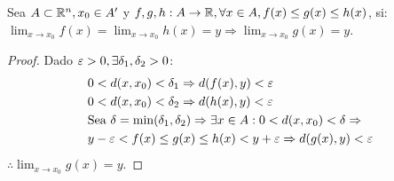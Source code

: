 \begin{theorem}
  Sea \(A \subset \mathbb{R}^n, x_0 \in A^{\prime} \) y \(f, g, h: A \to \mathbb{R}, \forall x \in A, f(x) \leq g(x) \leq h(x)\), si: \\
  \(\lim_{x \to x_0} f(x) = \lim_{x \to x_0} h(x) = y \Rightarrow \lim_{x \to x_0} g(x) = y\).
  \begin{proof}
    Dado \(\varepsilon > 0, \exists \delta_1, \delta_2 > 0\):
    \begin{align*}
       & 0 < d(x, x_0) < \delta_1 \Rightarrow d(f(x), y) < \varepsilon                                                                 \\
       & 0 < d(x, x_0) < \delta_2 \Rightarrow d(h(x), y) < \varepsilon                                                                 \\
       & \text{Sea } \delta = \text{min}(\delta_1, \delta_2) \Rightarrow \exists x \in A : 0 < d(x, x_0) < \delta \Rightarrow \\
       & y - \varepsilon < f(x) \leq g(x) \leq h(x) < y + \varepsilon \Rightarrow d(g(x), y) < \varepsilon
    \end{align*}
    \(\therefore \lim_{x \to x_0} g(x) = y\).
  \end{proof}
\end{theorem}
